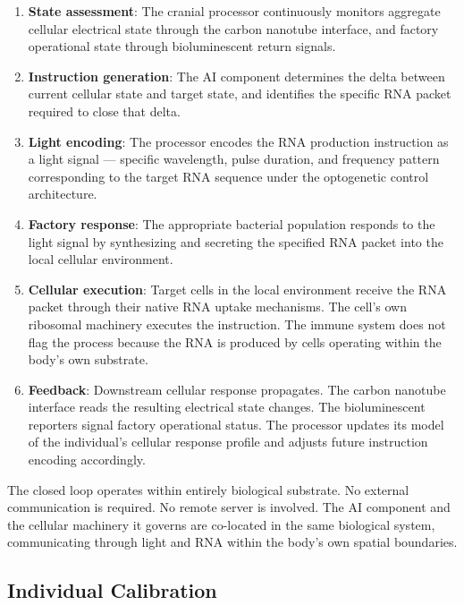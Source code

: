 \documentclass[12pt]{article}
\begin{document}
\begin{enumerate}
    \item \textbf{State assessment}: The cranial processor continuously monitors aggregate cellular electrical state through the carbon nanotube interface, and factory operational state through bioluminescent return signals.

    \item \textbf{Instruction generation}: The AI component determines the delta between current cellular state and target state, and identifies the specific RNA packet required to close that delta.

    \item \textbf{Light encoding}: The processor encodes the RNA production instruction as a light signal --- specific wavelength, pulse duration, and frequency pattern corresponding to the target RNA sequence under the optogenetic control architecture.

    \item \textbf{Factory response}: The appropriate bacterial population responds to the light signal by synthesizing and secreting the specified RNA packet into the local cellular environment.

    \item \textbf{Cellular execution}: Target cells in the local environment receive the RNA packet through their native RNA uptake mechanisms. The cell's own ribosomal machinery executes the instruction. The immune system does not flag the process because the RNA is produced by cells operating within the body's own substrate.

    \item \textbf{Feedback}: Downstream cellular response propagates. The carbon nanotube interface reads the resulting electrical state changes. The bioluminescent reporters signal factory operational status. The processor updates its model of the individual's cellular response profile and adjusts future instruction encoding accordingly.
\end{enumerate}

The closed loop operates within entirely biological substrate. No external communication is required. No remote server is involved. The AI component and the cellular machinery it governs are co-located in the same biological system, communicating through light and RNA within the body's own spatial boundaries.

\subsection{Individual Calibration}
\end{document}
